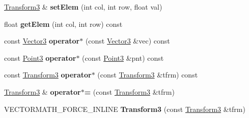 \begin{DoxyCompactItemize}
\item 
\hypertarget{class_vectormath_1_1_aos_1_1_transform3_a3eb08c29099ed7cbfb843621803afc54}{\hyperlink{class_vectormath_1_1_aos_1_1_transform3}{Transform3} \& {\bfseries set\+Elem} (int col, int row, float val)}\label{class_vectormath_1_1_aos_1_1_transform3_a3eb08c29099ed7cbfb843621803afc54}

\item 
\hypertarget{class_vectormath_1_1_aos_1_1_transform3_aa351e32f7c872626e71e1554a6489f36}{float {\bfseries get\+Elem} (int col, int row) const }\label{class_vectormath_1_1_aos_1_1_transform3_aa351e32f7c872626e71e1554a6489f36}

\item 
\hypertarget{class_vectormath_1_1_aos_1_1_transform3_a02d3e76a76eca287c89e6d725661dc9b}{const \hyperlink{class_vectormath_1_1_aos_1_1_vector3}{Vector3} {\bfseries operator$\ast$} (const \hyperlink{class_vectormath_1_1_aos_1_1_vector3}{Vector3} \&vec) const }\label{class_vectormath_1_1_aos_1_1_transform3_a02d3e76a76eca287c89e6d725661dc9b}

\item 
\hypertarget{class_vectormath_1_1_aos_1_1_transform3_afb24b2eb78a98ab5afeb4202976f3f6f}{const \hyperlink{class_vectormath_1_1_aos_1_1_point3}{Point3} {\bfseries operator$\ast$} (const \hyperlink{class_vectormath_1_1_aos_1_1_point3}{Point3} \&pnt) const }\label{class_vectormath_1_1_aos_1_1_transform3_afb24b2eb78a98ab5afeb4202976f3f6f}

\item 
\hypertarget{class_vectormath_1_1_aos_1_1_transform3_aaafd7e1c85d3fa3c7aa12563fe0ccd18}{const \hyperlink{class_vectormath_1_1_aos_1_1_transform3}{Transform3} {\bfseries operator$\ast$} (const \hyperlink{class_vectormath_1_1_aos_1_1_transform3}{Transform3} \&tfrm) const }\label{class_vectormath_1_1_aos_1_1_transform3_aaafd7e1c85d3fa3c7aa12563fe0ccd18}

\item 
\hypertarget{class_vectormath_1_1_aos_1_1_transform3_a4c60d026163dba82261e9ce188ca7fb7}{\hyperlink{class_vectormath_1_1_aos_1_1_transform3}{Transform3} \& {\bfseries operator$\ast$=} (const \hyperlink{class_vectormath_1_1_aos_1_1_transform3}{Transform3} \&tfrm)}\label{class_vectormath_1_1_aos_1_1_transform3_a4c60d026163dba82261e9ce188ca7fb7}

\item 
\hypertarget{class_vectormath_1_1_aos_1_1_transform3_aafa1a3ff376c54610ad183b231c32193}{V\+E\+C\+T\+O\+R\+M\+A\+T\+H\+\_\+\+F\+O\+R\+C\+E\+\_\+\+I\+N\+L\+I\+N\+E {\bfseries Transform3} (const \hyperlink{class_vectormath_1_1_aos_1_1_transform3}{Transform3} \&tfrm)}\label{class_vectormath_1_1_aos_1_1_transform3_aafa1a3ff376c54610ad183b231c32193}


\end{DoxyCompactItemize}
